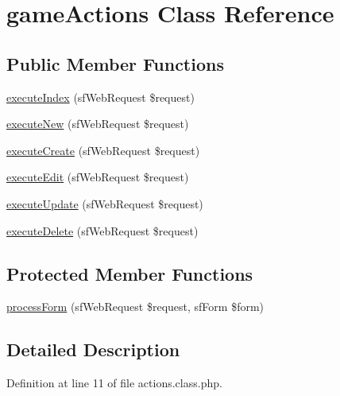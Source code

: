 \hypertarget{classgame_actions}{\section{game\-Actions Class Reference}
\label{classgame_actions}
}
\subsection*{Public Member Functions}
\begin{DoxyCompactItemize}
\item 
\hyperlink{classgame_actions_a948cc911eb1d9f77990be54af3b2080f}{execute\-Index} (sf\-Web\-Request \$request)
\item 
\hyperlink{classgame_actions_a0ffbea56560c6c633dae68ec22aff21c}{execute\-New} (sf\-Web\-Request \$request)
\item 
\hyperlink{classgame_actions_a75837617743fb64dca82d8133b2c662a}{execute\-Create} (sf\-Web\-Request \$request)
\item 
\hyperlink{classgame_actions_af4d8fedd4b28f3398826a1bb8fa54394}{execute\-Edit} (sf\-Web\-Request \$request)
\item 
\hyperlink{classgame_actions_af7b4f51862add3c2ebb54efc136a0840}{execute\-Update} (sf\-Web\-Request \$request)
\item 
\hyperlink{classgame_actions_a52b5b11b11a0070dd2662257520c045a}{execute\-Delete} (sf\-Web\-Request \$request)
\end{DoxyCompactItemize}
\subsection*{Protected Member Functions}
\begin{DoxyCompactItemize}
\item 
\hyperlink{classgame_actions_a7cf661d837626e0320753cbffa019a01}{process\-Form} (sf\-Web\-Request \$request, sf\-Form \$form)
\end{DoxyCompactItemize}


\subsection{Detailed Description}


Definition at line 11 of file actions.\-class.\-php.



